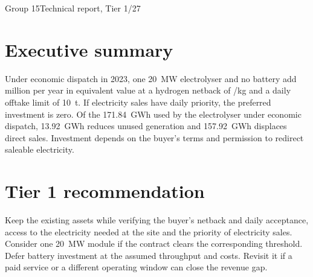 \documentclass[11pt,a4paper]{article}
\begin{document}
  {Group 15\quad\textbar\quad Technical report, Tier 1\quad\textbar{}/27}

\section*{Executive summary}
Under economic dispatch in 2023, one 20~MW electrolyser and no battery add
 million per year in equivalent value at a hydrogen netback of
/kg and a daily offtake limit of 10~t. If electricity sales have
daily priority, the preferred investment is zero. Of the 171.84~GWh used by
the electrolyser under economic dispatch, 13.92~GWh reduces unused generation
and 157.92~GWh displaces direct sales. Investment depends on the buyer's
terms and permission to redirect saleable electricity.



\section{Tier 1 recommendation}
Keep the existing assets while verifying the buyer's netback and daily
acceptance, access to the electricity needed at the site and the priority
of electricity sales. Consider one 20~MW module if the contract clears
the corresponding threshold. Defer battery investment at the assumed
throughput and costs. Revisit it if a paid service or a different operating
window can close the revenue gap.


\end{document}
